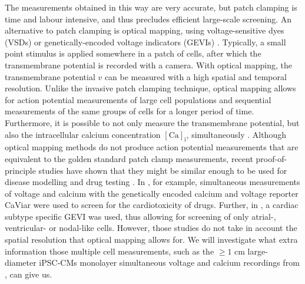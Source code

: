 \documentclass{article}
\begin{document}
The measurements obtained in this way are very accurate, but patch clamping is time and labour intensive, and thus precludes efficient large-scale screening. An alternative to patch clamping is optical mapping, using voltage-sensitive dyes (VSDs) or genetically-encoded voltage indicators (GEVIs) \cite{Denning2016}. Typically, a small point stimulus is applied somewhere in a patch of cells, after which the transmembrane potential is recorded with a camera. With optical mapping, the transmembrane potential $v$ can be measured with a high spatial and temporal resolution. Unlike the invasive patch clamping technique, optical mapping allows for action potential measurements of large cell populations and sequential measurements of the same groups of cells for a longer period of time. Furthermore, it is possible to not only measure the transmembrane potential, but also the intracellular calcium concentration $[\mathrm{Ca}]_{\mathrm{i}}$, simultaneously \cite{Lee2012}. 
Although optical mapping methods do not produce action potential measurements that are equivalent to the golden standard patch clamp measurements, recent proof-of-principle studies have shown that they might be similar enough to be used for disease modelling and drug testing \cite{Shukla2017}. In \cite{Dempsey2016}, for example, simultaneous measurements of voltage and calcium with the genetically encoded calcium and voltage reporter CaViar were used to screen for the cardiotoxicity of drugs. Further, in \cite{Chen2016},
a cardiac subtype specific GEVI was used, thus allowing for screening of only atrial-, ventricular- or nodal-like cells. However, those studies do not take in account the spatial resolution that optical mapping allows for. We will investigate what extra information those multiple cell measurements, such as the $\ge1$ cm large- diameter iPSC-CMs monolayer simultaneous voltage and calcium recordings from \cite{Lee2012}, can give us.
%
\end{document}
